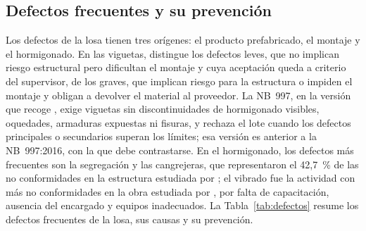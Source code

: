 \subsection{Defectos frecuentes y su prevención}

Los defectos de la losa tienen tres orígenes: el producto prefabricado, el montaje y el hormigonado. En las viguetas, \textcite[p.~116]{alcon2009} distingue los defectos leves, que no implican riesgo estructural pero dificultan el montaje y cuya aceptación queda a criterio del supervisor, de los graves, que implican riesgo para la estructura o impiden el montaje y obligan a devolver el material al proveedor. La NB~997, en la versión que recoge \textcite[pp.~89--92]{capcha2016}, exige viguetas sin discontinuidades de hormigonado visibles, oquedades, armaduras expuestas ni fisuras, y rechaza el lote cuando los defectos principales o secundarios superan los límites; esa versión es anterior a la NB~997:2016, con la que debe contrastarse. En el hormigonado, los defectos más frecuentes son la segregación y las cangrejeras, que representaron el 42,7~\% de las no conformidades en la estructura estudiada por \textcite[pp.~16--17]{muro2020}; el vibrado fue la actividad con más no conformidades en la obra estudiada por \textcite[p.~86]{ferrer2018}, por falta de capacitación, ausencia del encargado y equipos inadecuados. La Tabla~\ref{tab:defectos} resume los defectos frecuentes de la losa, sus causas y su prevención.

